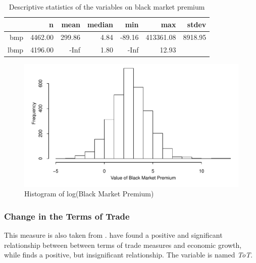\documentclass{article}\usepackage{graphicx, color}
\begin{document}
\begin{table}[ht]
\centering
\begin{tabular}{rrrrrrr}
  \hline
 & n & mean & median & min & max & stdev \\ 
  \hline
bmp & 4462.00 & 299.86 & 4.84 & -89.16 & 413361.08 & 8918.95 \\ 
  lbmp & 4196.00 & -Inf & 1.80 & -Inf & 12.93 &  \\ 
   \hline
\end{tabular}
\caption{Descriptive statistics of the variables on black market premium} 
\label{bmp_tab}
\end{table}
\begin{figure}[]


{\centering \includegraphics[width=.9\linewidth]{figure/bmp_tab} 

}

\caption[Histogram of log(Black Market Premium)]{Histogram of log(Black Market Premium)\label{fig:bmp_tab}}
\end{figure}





\subsubsection{Change in the Terms of Trade}

This measure is also taken from \citet{easterly2001globaldevelopment}.\citet[p. 531]{barro2004economic}
have found a positive and significant relationship between between
terms of trade measures and economic growth, while \citet[p. 24]{barro1994sources}
finds a positive, but insignificant relationship. The variable is
named \emph{ToT}.
\end{document}
